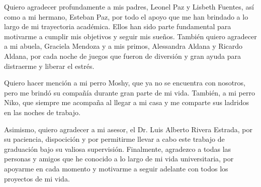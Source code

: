 Quiero agradecer profundamente a mis padres, Leonel Paz y Lisbeth Fuentes, así como a mi hermano, Esteban Paz, por todo el apoyo que me han brindado a lo largo de mi trayectoria académica. Ellos han sido parte fundamental para motivarme a cumplir mis objetivos y seguir mis sueños. También quiero agradecer a mi abuela, Graciela Mendoza y a mis primos, Alessandra Aldana y Ricardo Aldana, por cada noche de juegos que fueron de diversión y gran ayuda para distraerme y liberar el estrés.

Quiero hacer mención a mi perro Moshy, que ya no se encuentra con nosotros, pero me brindó su compañía durante gran parte de mi vida. También, a mi perro Niko, que siempre me acompaña al llegar a mi casa y me comparte sus ladridos en las noches de trabajo.

Asimismo, quiero agradecer a mi asesor, el Dr. Luis Alberto Rivera Estrada, por su paciencia, dispocición y por permitirme llevar a cabo este trabajo de graduación bajo su valiosa supervisión. Finalmente, agradezco a todas las personas y amigos que he conocido a lo largo de mi vida universitaria, por apoyarme en cada momento y motivarme a seguir adelante con todos los proyectos de mi vida.